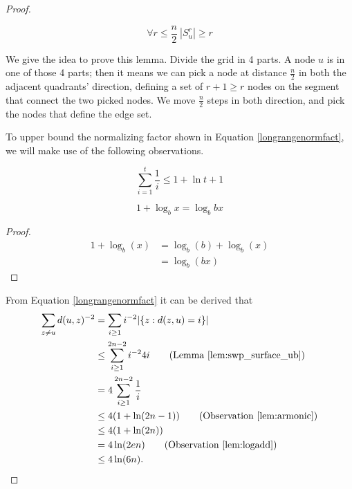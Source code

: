 \begin{proof}
\begin{lem}\label{lem:swp_surf_lb}
\begin{equation}
\forall r \leq \frac{n}{2}\ |S_u^r| \geq r
\end{equation}
\end{lem}

We give the idea to prove this lemma. Divide the grid in 4 parts. A node $u$ is in one of those 4 parts; then it means we can pick a node at distance $\frac{n}{2}$ in both the adjacent quadrants' direction, defining a set of $r+1\geq r$ nodes on the segment that connect the two picked nodes. We move $\frac{n}{2}$ steps in both direction, and pick the nodes that define the edge set.

To upper bound the normalizing factor shown in Equation \ref{longrangenormfact}, we will make use of the following observations.

\begin{obs}\label{lem:armonic}
	\begin{equation}
	\sum_{i=1}^t \frac{1}{i} \leq 1 + \ln{t+1}
	\end{equation}
\end{obs}

\begin{obs}\label{lem:logadd}
	\begin{equation}
	1 + \log_b{x} = \log_b{bx}
	\end{equation}
	\begin{proof}
		\begin{align}
		1 + \log_b(x) &= \log_b(b) + \log_b(x)\\
		&= \log_b(bx)
		\end{align}
	\end{proof}
\end{obs}

From Equation \ref{longrangenormfact} it can be derived that
\begin{align}
\sum_{z \neq u}d(u, z)^{-2} &= \sum_{i \geq 1} i^{-2} |\{z : d(z, u) = i\}|\\
&\leq \sum_{i \geq 1}^{2n-2}i^{-2}4i \tag{Lemma \ref{lem:swp_surface_ub}}\\
&=4\sum_{i \geq 1}^{2n-2} \frac{1}{i}\\
& \leq 4(1 + \ln(2n-1)) \tag{Observation \ref{lem:armonic}}\\
& \leq 4(1 + \ln(2n))\\
& = 4\ln(2en) \tag{Observation \ref{lem:logadd}}\\
& \leq 4\ln(6n).
\end{align}


\end{proof}
